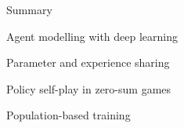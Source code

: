 \begin{frame}{Summary}
        \blist
            \item Agent modelling with deep learning
            \item Parameter and experience sharing
            \item Policy self-play in zero-sum games
            \item Population-based training
        \elist

        
\end{frame}


